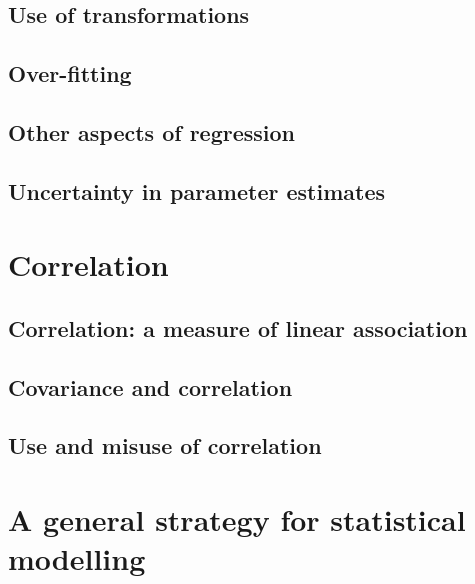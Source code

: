 \documentclass[
  british,
]{book}
\begin{document}
\hypertarget{linregtrans}{%
\section{Use of transformations}\label{linregtrans}}

\hypertarget{over-fitting}{%
\section{Over-fitting}\label{over-fitting}}

\hypertarget{other-aspects-of-regression}{%
\section{Other aspects of regression}\label{other-aspects-of-regression}}

\hypertarget{uncertainty-in-parameter-estimates}{%
\section{Uncertainty in parameter estimates}\label{uncertainty-in-parameter-estimates}}

\hypertarget{correlationchapter}{%
\chapter{Correlation}\label{correlationchapter}}

\hypertarget{correlation-a-measure-of-linear-association}{%
\section{Correlation: a measure of linear association}\label{correlation-a-measure-of-linear-association}}

\hypertarget{covariance-and-correlation}{%
\section{Covariance and correlation}\label{covariance-and-correlation}}

\hypertarget{use-and-misuse-of-correlation}{%
\section{Use and misuse of correlation}\label{use-and-misuse-of-correlation}}

\hypertarget{a-general-strategy-for-statistical-modelling}{%
\chapter{A general strategy for statistical modelling}\label{a-general-strategy-for-statistical-modelling}}

  
\end{document}

